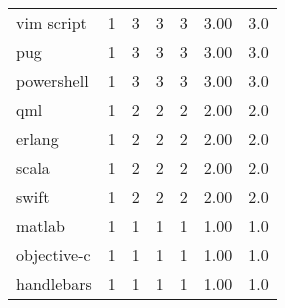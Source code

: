 \begin{tabular}{lrrrrrr}
vim script       &          1 &           3 &    3 &    3 &   3.00 &      3.0 \\
pug              &          1 &           3 &    3 &    3 &   3.00 &      3.0 \\
powershell       &          1 &           3 &    3 &    3 &   3.00 &      3.0 \\
qml              &          1 &           2 &    2 &    2 &   2.00 &      2.0 \\
erlang           &          1 &           2 &    2 &    2 &   2.00 &      2.0 \\
scala            &          1 &           2 &    2 &    2 &   2.00 &      2.0 \\
swift            &          1 &           2 &    2 &    2 &   2.00 &      2.0 \\
matlab           &          1 &           1 &    1 &    1 &   1.00 &      1.0 \\
objective-c      &          1 &           1 &    1 &    1 &   1.00 &      1.0 \\
handlebars       &          1 &           1 &    1 &    1 &   1.00 &      1.0 \\
\bottomrule
\end{tabular}
